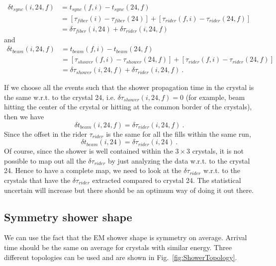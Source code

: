 \begin{align}
\delta t_{sync}(i,24,f)   &= t_{sync}(f,i) - t_{sync}(24,f)  \\
                         &= \left[\tau_{fiber}(i) -  \tau_{fiber}(24) \right]+ \left[\tau_{rider}(f,i) -  \tau_{rider}(24,f) \right] \\
                         &= \delta \tau_{fiber}(i,24) + \delta \tau_{rider}(i,24,f) \label{eq:tsync24}
\end{align}
%
and
%
\begin{align}
\delta t_{beam}(i,24,f)  &= t_{beam}(f,i) - t_{beam}(24,f)  \\
                         &= \left[ \tau_{shower}(f,i) -  \tau_{shower}(24,f)  \right] + \left[ \tau_{rider}(f,i) -  \tau_{rider}(24,f) \right] \\
                         &= \delta \tau_{shower}(i,24,f) + \delta \tau_{rider}(i,24,f)~.\label{eq:tbeam24}
\end{align}

If we choose all the events such that the shower propagation time in the crystal is the same w.r.t. to the crystal 24, i.e. $\delta \tau_{shower}(i,24,f)=0$ (for example, beam hitting the center of the crystal or hitting at the common border of the crystals),
then we have
%
\begin{equation}
\delta t_{beam}(i,24,f)   = \delta \tau_{rider}(i,24,f)~.
\end{equation}
%
Since the offset in the rider $\tau_{rider}$ is the same for all the fills within the same run, 
%
\begin{equation}
\delta t_{beam}(i,24)   = \delta \tau_{rider}(i,24)~.
\end{equation}
%
Of course, since the shower is well contained within the $3\times3$ crystals, it is not possible to map out all the $\delta \tau_{rider}$ by just analyzing
the data w.r.t. to the crystal 24. Hence to have a complete map, we need to look at the $\delta \tau_{rider}$ w.r.t. to the crystals that have the  $\delta \tau_{rider}$ extracted compared to crystal 24. The statistical uncertain will increase but there should be an optimum way of doing it out there.

\subsection*{Symmetry shower shape}

We can use the fact that the EM shower shape is symmetry on average. Arrival time should be the same on average for crystals with similar energy. Three different topologies can be used and are shown in Fig.~\ref{fig:ShowerTopology}.

